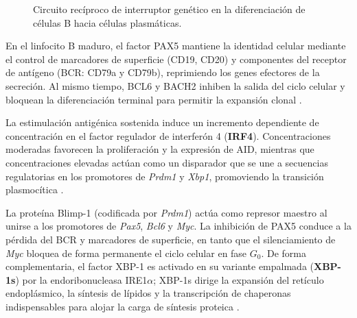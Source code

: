 \begin{figure}[htbp]
\centering
{}
\caption{Circuito recíproco de interruptor genético en la diferenciación de células B hacia células plasmáticas.}
\label{fig:circuito_transcripcional}
\end{figure}

En el linfocito B maduro, el factor PAX5 mantiene la identidad celular mediante el control de marcadores de superficie (CD19, CD20) y componentes del receptor de antígeno (BCR: CD79a y CD79b), reprimiendo los genes efectores de la secreción. Al mismo tiempo, BCL6 y BACH2 inhiben la salida del ciclo celular y bloquean la diferenciación terminal para permitir la expansión clonal \parencite{nutt2015generation}.

La estimulación antigénica sostenida induce un incremento dependiente de concentración en el factor regulador de interferón 4 (\textbf{IRF4}). Concentraciones moderadas favorecen la proliferación y la expresión de AID, mientras que concentraciones elevadas actúan como un disparador que se une a secuencias regulatorias en los promotores de \emph{Prdm1} y \emph{Xbp1}, promoviendo la transición plasmocítica \parencite{shapiroshelef2005regulation}.

La proteína Blimp-1 (codificada por \emph{Prdm1}) actúa como represor maestro al unirse a los promotores de \emph{Pax5}, \emph{Bcl6} y \emph{Myc}. La inhibición de PAX5 conduce a la pérdida del BCR y marcadores de superficie, en tanto que el silenciamiento de \emph{Myc} bloquea de forma permanente el ciclo celular en fase $G_0$. De forma complementaria, el factor XBP-1 es activado en su variante empalmada (\textbf{XBP-1s}) por la endoribonucleasa IRE1$\alpha$; XBP-1s dirige la expansión del retículo endoplásmico, la síntesis de lípidos y la transcripción de chaperonas indispensables para alojar la carga de síntesis proteica \parencite{todd2009xbp1}.

